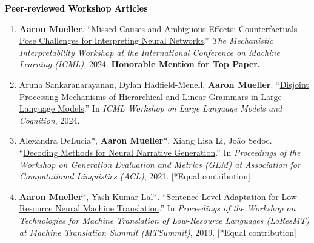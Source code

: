 \documentclass[10pt]{article}
\renewcommand{\subsection}[1]{\textcolor{black}{#1}}
\newcommand{\halfblankline}{\quad\vspace{-0.5\baselineskip}\pagebreak[3]}
\providecommand*\titlelink[2]{\href{#1}{\textcolor{accent}{#2}}}
\begin{document}
	\subsection{\textbf{Peer-reviewed Workshop Articles}}
	\begin{enumerate}[leftmargin=*, topsep=0pt, itemsep=0.25ex, partopsep=0ex, parsep=1ex, label=W\arabic*., ref=W\arabic*]
	
	\item \textbf{Aaron Mueller}. ``\titlelink{https://arxiv.org/abs/2407.04690v1}{Missed Causes and Ambiguous Effects: Counterfactuals Pose Challenges for Interpreting Neural Networks}.'' \emph{The Mechanistic Interpretability Workshop at the International Conference on Machine Learning (ICML)}, 2024. \textbf{\textcolor{accent}{Honorable Mention for Top Paper.}}\label{pub:missed-causes}

	\item Aruna Sankaranarayanan, Dylan Hadfield-Menell, \textbf{Aaron Mueller}. ``\titlelink{https://openreview.net/forum?id=qg2TJ3eKOr}{Disjoint Processing Mechanisms of Hierarchical and Linear Grammars in Large Language Models}.'' In \emph{ICML Workshop on Large Language Models and Cognition}, 2024.\label{pub:disjoint-mechanisms}

	\item Alexandra DeLucia*, \textbf{Aaron Mueller}*, Xiang Lisa Li, João Sedoc. ``\titlelink{https://aclanthology.org/2021.gem-1.16/}{Decoding Methods for Neural Narrative Generation}.'' In \emph{Proceedings of the Workshop on Generation Evaluation and Metrics (GEM) at Association for Computational Linguistics (ACL)}, 2021. [*Equal contribution]\label{pub:decoding-methods}

	\item \textbf{Aaron Mueller}*, Yash Kumar Lal*. ``\titlelink{https://aclanthology.org/W19-6807/}{Sentence-Level Adaptation for Low-Resource Neural Machine Translation}.'' In \emph{Proceedings of the Workshop on Technologies for Machine Translation of Low-Resource Languages (LoResMT) at Machine Translation Summit (MTSummit)}, 2019. [*Equal contribution]\label{pub:sent-level}
	
	\end{enumerate}

	\halfblankline
\end{document}
